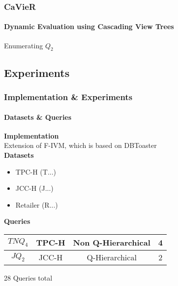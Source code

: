 \documentclass[
	11pt, %
]{beamer}
\begin{document}
\begin{frame}
	\frametitle{CaVieR}
	\framesubtitle{Dynamic Evaluation using Cascading View Trees}
	Enumerating $Q_2$
	\begin{figure}
	\end{figure}
\end{frame}

\subsection{Experiments}
\begin{frame}
	\frametitle{Implementation \& Experiments}
	\framesubtitle{Datasets \& Queries}
	\textbf{Implementation}\\
	Extension of F-IVM, which is based on DBToaster\\
	\vspace{0.1cm}
	\textbf{Datasets}
	\begin{itemize}
		\item TPC-H	  (T...)
		\item JCC-H   (J...)
		\item Retailer  (R...)
	\end{itemize}
	\vspace{1em}
	\textbf{Queries}\\
	\vspace{0.5em}
	\begin{tabular}{c!{\vrule width 2pt}c|c|c}
		$TNQ_4$ & TPC-H & Non Q-Hierarchical  & 4 \rule{0pt}{2.5ex}\\
		\hline \rule{0pt}{2.5ex}
		$JQ_2$ & JCC-H & Q-Hierarchical & 2 \\
	\end{tabular}
	
	\vspace{1em}
	28 Queries total
\end{frame}
\end{document}
